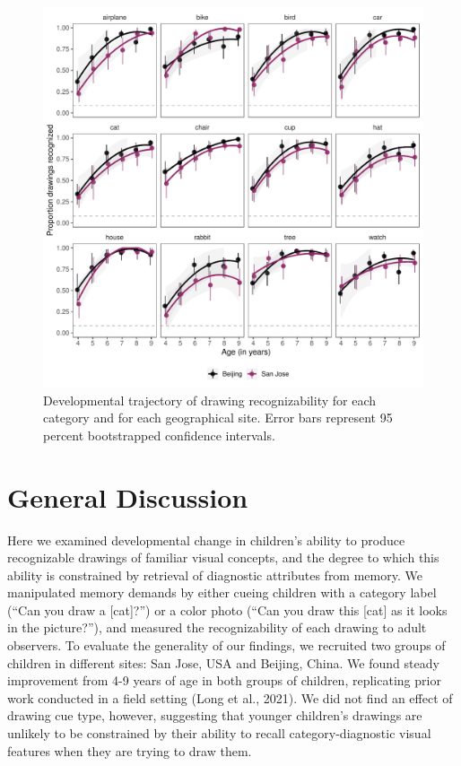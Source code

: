 \documentclass[
  man]{apa6}
\begin{document}
\begin{figure}[H]

{\centering \includegraphics[width=\textwidth]{figs/item-effects-1} 

}

\caption{Developmental trajectory of drawing recognizability for each category and for each geographical site. Error bars represent 95 percent bootstrapped confidence intervals.}\label{fig:item-effects}
\end{figure}

\hypertarget{general-discussion}{%
\section{General Discussion}\label{general-discussion}}

Here we examined developmental change in children's ability to produce recognizable drawings of familiar visual concepts, and the degree to which this ability is constrained by retrieval of diagnostic attributes from memory.
We manipulated memory demands by either cueing children with a category label (``Can you draw a {[}cat{]}?'') or a color photo (``Can you draw this {[}cat{]} as it looks in the picture?''), and measured the recognizability of each drawing to adult observers.
To evaluate the generality of our findings, we recruited two groups of children in different sites: San Jose, USA and Beijing, China.
We found steady improvement from 4-9 years of age in both groups of children, replicating prior work conducted in a field setting (Long et al., 2021). We did not find an effect of drawing cue type, however, suggesting that younger children's drawings are unlikely to be constrained by their ability to recall category-diagnostic visual features when they are trying to draw them.
\end{document}
